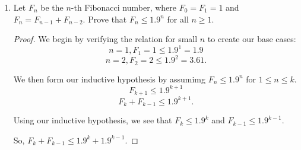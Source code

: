 \documentclass{article}
\begin{document}
\begin{enumerate}
{\begin{proof}
            For \(n=1\), we have \(9^1 + 5^1 - 2 = 12 = 4(3)\).

            For \(n=2\), we have \(9^2 + 5^2 - 2 = 104 = 4(26)\).

            We can make the inductive hypothesis that \(9^n + 5^n - 2 = 4m\)
            holds true for \(1 \le n \le k\).

            Thus,
            \[9^k = 4m - 5^k + 2\]
            and
            \[5^k = 4m - 9^k + 2.\]

            Then, we see if the relation holds for \(n = k+1\) via the following 
            algebraic manipulation: 
            \[9^{k+1} + 5^{k+1} - 2\]
            \[9(9^k) + 5(5^k) - 2\]
            \[9(4m - 5^k + 2) + 5(4m - 9^k + 2) - 2\]
            \[36m - 9(5^k) + 18 + 20m - 5(9^k) + 10 - 2\]
            \[56m - 9(5^k) + 5(9^k) + 26\]
            \[56m - 45(\frac{5^k}{5} + \frac{9^k}{9}) + 26\]
            \[56m - 45(5^{k-1} + 9^{k-1} - 2) - 2(45) + 26\]
            \[56m - 45(5^{k-1} + 9^{k-1} - 2) - 64.\]
            
            Now, we can use our inductive hypothesis to say 
            \(5^{k-1} + 9^{k-1} - 2 = 4m_1\).

            Thus we have 
            \[9^{k+1} + 5^{k+1} - 2 = 56m - 45(4m_1) - 64 = 4(14m - 45m_1 - 16).\]

            Therefore, \(9^n + 5^n - 2\) is divisible by 4 for all \(n \ge 1\).
        \end{proof}
    }

    \item {
        Let \(F_n\) be the \(n\)-th Fibonacci number, where \(F_0 = F_1 = 1\)
        and \(F_n = F_{n-1} + F_{n-2}\). Prove that \(F_n \le 1.9^n\) for all
        \(n \ge 1\).

        \begin{proof}
            We begin by verifying the relation for small \(n\) to create our 
            base cases:
            \[n = 1, F_1 = 1 \le 1.9^1 = 1.9\]
            \[n = 2, F_2 = 2 \le 1.9^2 = 3.61.\]

            We then form our inductive hypothesis by assumimg \(F_n \le 1.9^n\) for \(1 \le n \le k\).
            \[F_{k+1} \le 1.9^{k+1}\]
            \[F_k + F_{k-1} \le 1.9^{k+1}.\]

            Using our inductive hypothesis, we see that \(F_k \le 1.9^k\)
            and \(F_{k-1} \le 1.9^{k-1}\).

            So, \(F_k + F_{k-1} \le 1.9^k + 1.9^{k-1}\).


\end{proof}}
\end{enumerate}
\end{document}
